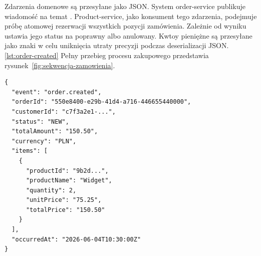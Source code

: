 Zdarzenia domenowe są przesyłane jako JSON. System order-service publikuje wiadomość na temat .
Product-service, jako konsument tego zdarzenia, podejmuje próbę atomowej rezerwacji wszystkich pozycji zamówienia.
Zależnie od wyniku ustawia jego status na poprawny albo anulowany. Kwtoy pieniężne są przesyłane jako znaki 
w celu uniknięcia utraty precyzji podczas deserializacji JSON. \ref{lst:order-created}
Pełny przebieg procesu zakupowego przedstawia rysunek~\ref{fig:sekwencja-zamowienia}.

\begin{lstlisting}[caption={Struktura zdarzenia order.created},label={lst:order-created}]
{
  "event": "order.created",
  "orderId": "550e8400-e29b-41d4-a716-446655440000",
  "customerId": "c7f3a2e1-...",
  "status": "NEW",
  "totalAmount": "150.50",
  "currency": "PLN",
  "items": [
    {
      "productId": "9b2d...",
      "productName": "Widget",
      "quantity": 2,
      "unitPrice": "75.25",
      "totalPrice": "150.50"
    }
  ],
  "occurredAt": "2026-06-04T10:30:00Z"
}
\end{lstlisting}

